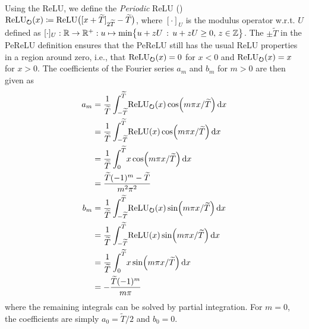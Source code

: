 Using the ReLU, we define the \emph{Periodic} \ac{ReLU} () $\operatorname{ReLU}_{\bm{\circlearrowright}}(x) \coloneqq \operatorname{ReLU}\bigl([x + \widetilde{T}]_{2\widetilde{T}} - \widetilde{T}\bigr)$, where $[\cdot]_U$ is the modulus operator w.r.t. $U$ defined as $[\cdot]_U : \mathbb{R} \to \mathbb{R}^+ : u \mapsto \min\bigl\{ u + zU \,:\, u + zU \geq 0,\, z \in \mathbb{Z} \bigr\}$.
The $\pm \tilde{T}$ in the \ac{PeReLU} definition ensures that the \ac{PeReLU} still has the usual \ac{ReLU} properties in a region around zero, i.e., that $\operatorname{ReLU}_{\bm{\circlearrowright}}(x) = 0$ for $x < 0$ and $\operatorname{ReLU}_{\bm{\circlearrowright}}(x) = x$ for $x > 0$.
The coefficients of the Fourier series $a_m$ and $b_m$ for $m > 0$ are then given as
\begin{align}
    a_m &= \frac{1}{\widetilde{T}} \int_{-\widetilde{T}}^{\widetilde{T}}\! \operatorname{ReLU}_{\bm{\circlearrowright}}(x) \cos(m \pi x / \widetilde{T}) \dd{x} \\
        &= \frac{1}{\widetilde{T}} \int_{-\widetilde{T}}^{\widetilde{T}}\! \operatorname{ReLU}(x) \cos(m \pi x / \widetilde{T}) \dd{x} \\
        &= \frac{1}{\widetilde{T}} \int_{0}^{\widetilde{T}}\! x \cos(m \pi x / \widetilde{T}) \dd{x} \\
        &= \frac{\widetilde{T} (-1)^m - \widetilde{T}}{m^2\pi^2} \\
    b_m &= \frac{1}{\widetilde{T}} \int_{-\widetilde{T}}^{\widetilde{T}}\! \operatorname{ReLU}_{\bm{\circlearrowright}}(x) \sin(m \pi x / \widetilde{T}) \dd{x} \\
        &= \frac{1}{\widetilde{T}} \int_{-\widetilde{T}}^{\widetilde{T}}\! \operatorname{ReLU}(x) \sin(m \pi x / \widetilde{T}) \dd{x} \\
        &= \frac{1}{\widetilde{T}} \int_{0}^{\widetilde{T}}\! x \sin(m \pi x / \widetilde{T}) \dd{x} \\
        &= -\frac{\widetilde{T} (-1)^m}{m \pi}
\end{align}
where the remaining integrals can be solved by partial integration.
For $m = 0$, the coefficients are simply $a_0 = \tilde{T}/2$ and $b_0 = 0$.
